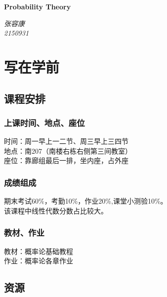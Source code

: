 \documentclass{book}%
\begin{document}
	
	\setlength{\parindent}{0pt}%
	
	\begin{titlepage}%
		\vspace*{\fill}
		\begin{center}
			\normalfont
			{\huge\bfseries Probability Theory}
			\bigskip
			
			{\Large\itshape 张容康\\2150931}
		\end{center}
	\end{titlepage}
	\thispagestyle{fancy}
	
	\newpage%
	\let\cleardoublepage\clearpage%
	\thispagestyle{empty}%
	\tableofcontents%
	\thispagestyle{empty}%
	
	
	\part{写在学前}
	
	\chapter{课程安排}
	
	\section{上课时间、地点、座位}
	时间：周一早上一二节、周三早上三四节\\
	地点：南207（南楼右栋右侧第三间教室）\\
	座位：靠廊组最后一排，坐内座，占外座\\
	
	\section{成绩组成}
	期末考试60\%，考勤10\%，作业20\%,课堂小测验10\%。\\
	该课程中线性代数分数占比较大。\\
	
	\section{教材、作业}
	教材：概率论基础教程\\
	作业：概率论各章作业\\
	
	\chapter{资源}
	
\end{document}
